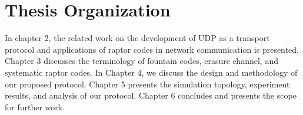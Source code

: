 \section{Thesis Organization}
 In chapter 2, the related work on the development of UDP as a transport protocol and applications of raptor codes in network communication is presented. Chapter 3 discusses the terminology of fountain codes, erasure channel, and systematic raptor codes. In Chapter 4, we discuss the design and methodology of our proposed protocol. Chapter 5 presents the simulation topology, experiment results, and analysis of our protocol. Chapter 6 concludes and presents the scope for further work.

